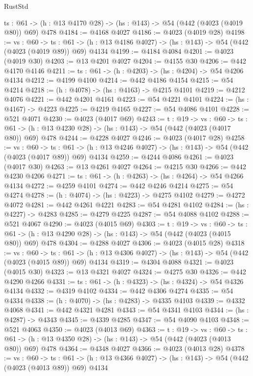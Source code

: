 \begin{lexlean}{RustStd}
\begin{coremodule}
  {ts : @61} -> (h : @13 @4170 @28) -> (hs : @143) -> @54 (@442 (@4023 (@4019 @80)) @69) @478
@4184 := @4168 @4027
@4186 := @4023 (@4019 @28)
@4198 := {vs : @60} ->
  {ts : @61} -> (h : @13 @4186 @4027) -> (hs : @143) -> @54 (@442 (@4023 (@4019 @89)) @69) @4134
@4199 := @4184 @4084
@4201 := @4023 (@4019 @30)
@4203 := @13 @4201 @4027
@4204 := @4155 @30
@4206 := @442 @4170 @4146
@4211 := {ts : @61} -> (h : @4203) -> (hs : @4204) -> @54 @4206 @4134
@4212 := @4199 @4100
@4214 := @442 @4186 @4154
@4215 := @54 @4214
@4218 := (h : @4078) -> (hs : @4163) -> @4215 @4101
@4219 := @4212 @4076
@4221 := @442 @4201 @4161
@4223 := @54 @4221 @4101
@4224 := (hs : @4167) -> @4223
@4225 := @4219 @4165
@4227 := @54 @4086 @4101
@4228 := @521 @4071
@4230 := @4023 (@4017 @69)
@4243 := {t : @19} ->
  {vs : @60} ->
  {ts : @61} -> (h : @13 @4230 @28) -> (hs : @143) -> @54 (@442 (@4023 (@4017 @80)) @69) @478
@4244 := @4228 @4027
@4246 := @4023 (@4017 @28)
@4258 := {vs : @60} ->
  {ts : @61} -> (h : @13 @4246 @4027) -> (hs : @143) -> @54 (@442 (@4023 (@4017 @89)) @69) @4134
@4259 := @4244 @4086
@4261 := @4023 (@4017 @30)
@4263 := @13 @4261 @4027
@4264 := @4215 @30
@4266 := @442 @4230 @4206
@4271 := {ts : @61} -> (h : @4263) -> (hs : @4264) -> @54 @4266 @4134
@4272 := @4259 @4101
@4274 := @442 @4246 @4214
@4275 := @54 @4274
@4278 := (h : @4074) -> (hs : @4223) -> @4275 @4102
@4279 := @4272 @4072
@4281 := @442 @4261 @4221
@4283 := @54 @4281 @4102
@4284 := (hs : @4227) -> @4283
@4285 := @4279 @4225
@4287 := @54 @4088 @4102
@4288 := @521 @4067
@4290 := @4023 (@4015 @69)
@4303 := {t : @19} ->
  {vs : @60} ->
  {ts : @61} -> (h : @13 @4290 @28) -> (hs : @143) -> @54 (@442 (@4023 (@4015 @80)) @69) @478
@4304 := @4288 @4027
@4306 := @4023 (@4015 @28)
@4318 := {vs : @60} ->
  {ts : @61} -> (h : @13 @4306 @4027) -> (hs : @143) -> @54 (@442 (@4023 (@4015 @89)) @69) @4134
@4319 := @4304 @4088
@4321 := @4023 (@4015 @30)
@4323 := @13 @4321 @4027
@4324 := @4275 @30
@4326 := @442 @4290 @4266
@4331 := {ts : @61} -> (h : @4323) -> (hs : @4324) -> @54 @4326 @4134
@4332 := @4319 @4102
@4334 := @442 @4306 @4274
@4335 := @54 @4334
@4338 := (h : @4070) -> (hs : @4283) -> @4335 @4103
@4339 := @4332 @4068
@4341 := @442 @4321 @4281
@4343 := @54 @4341 @4103
@4344 := (hs : @4287) -> @4343
@4345 := @4339 @4285
@4347 := @54 @4090 @4103
@4348 := @521 @4063
@4350 := @4023 (@4013 @69)
@4363 := {t : @19} ->
  {vs : @60} ->
  {ts : @61} -> (h : @13 @4350 @28) -> (hs : @143) -> @54 (@442 (@4023 (@4013 @80)) @69) @478
@4364 := @4348 @4027
@4366 := @4023 (@4013 @28)
@4378 := {vs : @60} ->
  {ts : @61} -> (h : @13 @4366 @4027) -> (hs : @143) -> @54 (@442 (@4023 (@4013 @89)) @69) @4134

\end{coremodule}
\end{lexlean}
